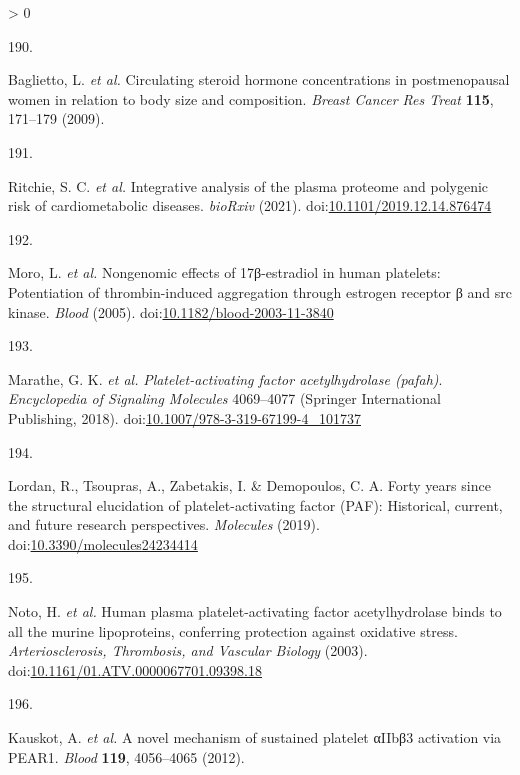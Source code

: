 \documentclass[11pt,twoside]{bristolthesis}
\newlength{\cslhangindent}
\newlength{\csllabelwidth}
\newenvironment{CSLReferences}[2] %
 {%
  \setlength{\parindent}{0pt}
  \ifodd #1 \everypar{\setlength{\hangindent}{\cslhangindent}}\ignorespaces\fi
  \ifnum #2 > 0
  \setlength{\parskip}{#2\baselineskip}
  \fi
 }%
 {}
\newcommand{\CSLLeftMargin}[1]{\parbox[t]{\csllabelwidth}{#1}}
\newcommand{\CSLRightInline}[1]{\parbox[t]{\linewidth - \csllabelwidth}{#1}\break}
\begin{document}
\begin{CSLReferences}{0}{0}
\leavevmode\hypertarget{ref-Baglietto2009}{}%
\CSLLeftMargin{190. }
\CSLRightInline{Baglietto, L. \emph{et al.} Circulating steroid hormone concentrations in postmenopausal women in relation to body size and composition. \emph{Breast Cancer Res Treat} \textbf{115}, 171--179 (2009).}

\leavevmode\hypertarget{ref-Ritchie2019}{}%
\CSLLeftMargin{191. }
\CSLRightInline{Ritchie, S. C. \emph{et al.} Integrative analysis of the plasma proteome and polygenic risk of cardiometabolic diseases. \emph{bioRxiv} (2021). doi:\href{https://doi.org/10.1101/2019.12.14.876474}{10.1101/2019.12.14.876474}}

\leavevmode\hypertarget{ref-Moro2005}{}%
\CSLLeftMargin{192. }
\CSLRightInline{Moro, L. \emph{et al.} Nongenomic effects of 17β-estradiol in human platelets: Potentiation of thrombin-induced aggregation through estrogen receptor β and src kinase. \emph{Blood} (2005). doi:\href{https://doi.org/10.1182/blood-2003-11-3840}{10.1182/blood-2003-11-3840}}

\leavevmode\hypertarget{ref-Marathe2018}{}%
\CSLLeftMargin{193. }
\CSLRightInline{Marathe, G. K. \emph{et al.} \emph{Platelet-activating factor acetylhydrolase (pafah)}. \emph{Encyclopedia of Signaling Molecules} 4069--4077 (Springer International Publishing, 2018). doi:\href{https://doi.org/10.1007/978-3-319-67199-4_101737}{10.1007/978-3-319-67199-4\_101737}}

\leavevmode\hypertarget{ref-Lordan2019}{}%
\CSLLeftMargin{194. }
\CSLRightInline{Lordan, R., Tsoupras, A., Zabetakis, I. \& Demopoulos, C. A. Forty years since the structural elucidation of platelet-activating factor (PAF): Historical, current, and future research perspectives. \emph{Molecules} (2019). doi:\href{https://doi.org/10.3390/molecules24234414}{10.3390/molecules24234414}}

\leavevmode\hypertarget{ref-Noto2003}{}%
\CSLLeftMargin{195. }
\CSLRightInline{Noto, H. \emph{et al.} Human plasma platelet-activating factor acetylhydrolase binds to all the murine lipoproteins, conferring protection against oxidative stress. \emph{Arteriosclerosis, Thrombosis, and Vascular Biology} (2003). doi:\href{https://doi.org/10.1161/01.ATV.0000067701.09398.18}{10.1161/01.ATV.0000067701.09398.18}}

\leavevmode\hypertarget{ref-Kauskot2012}{}%
\CSLLeftMargin{196. }
\CSLRightInline{Kauskot, A. \emph{et al.} A novel mechanism of sustained platelet αIIbβ3 activation via PEAR1. \emph{Blood} \textbf{119}, 4056--4065 (2012).}


\end{CSLReferences}
\end{document}
